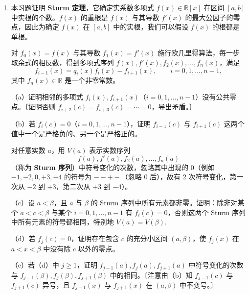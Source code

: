 \begin{enumerate}
（c）（\(\operatorname{ch}(K) = 2\)）若 \(K\) 的特征为 2，证明 \(f(x)\) 的判别式总是平方。证明可设 \(f(x)\) 具有形式 \(x^3+px+q\)，且 \(f(x)\) 的伽罗瓦群是 \(A_3\) 当且仅当二次式 \(x^2+qx+(p^3+q^2)\) 在 \(K\) 中有根（等价地，\((p^3+q^2)/q^2 \in K\) 属于 Artin--Schreier 映射 \(x \mapsto x^2-x\)（把 \(K\) 映到 \(K\)）的像）。

（d）设 \(t\) 在 \(\mathbb{F}_2\) 上超越，\(K = \mathbb{F}_2(t)\). 证明多项式 \(x^3+t^2x+t^3\)、\(x^3+(t^2+t+1)x+(t^2+t+1)\) 与 \(x^3+(t^2+t+1)x+(t^3+t^2+t)\) 的伽罗瓦群为 \(A_3\)，而 \(x^3+t^2x+t\) 与 \(x^3+x+t\) 的伽罗瓦群为 \(S_3\).

\item 本习题证明 \textbf{Sturm 定理}，它确定实系数多项式 \(f(x) \in \mathbb{R}[x]\) 在区间 \([a, b]\) 中实根的个数。\(f(x)\) 的重根是 \(f(x)\) 与其导数 \(f'(x)\) 的最大公因子的零点，因此为确定 \(f(x)\) 在 \([a, b]\) 中的实根，我们可以假设 \(f(x)\) 的根都是单根。

对 \(f_0(x) = f(x)\) 与其导数 \(f_1(x) = f'(x)\) 施行欧几里得算法，每一步取余式的相反数，得到多项式序列 \(f(x), f'(x), f_2(x), \ldots, f_n(x)\)，满足
\[
f_{i-1}(x) = q_i(x)f_i(x)-f_{i+1}(x), \qquad i = 0, 1, \ldots, n-1,
\]
其中 \(f_n(x) \in \mathbb{R}\) 是一个非零常数。

（a）证明相邻的多项式 \(f_i(x), f_{i+1}(x)\)（\(i = 0, 1, \ldots, n-1\)）没有公共零点。〔证明否则 \(f_{i+2}(c) = f_{i+3}(c) = \cdots = 0\)，导出矛盾。〕

（b）若 \(f_i(c) = 0\)（\(i = 0, 1, \ldots, n-1\)），证明 \(f_{i-1}(c)\) 与 \(f_{i+1}(c)\) 这两个值中一个是严格负的、另一个是严格正的。

对任意实数 \(a\)，用 \(V(a)\) 表示实数序列
\[
f(a), f'(a), f_2(a), \ldots, f_n(a)
\]
（称为 \textbf{Sturm 序列}）中符号变化的次数，忽略其中出现的 0（例如 \(-1, -2, 0, +3, -4\) 的符号为 \(--+-\)（忽略 0 后），故有 2 次符号变化，第一次从 \(-2\) 到 \(+3\)，第二次从 \(+3\) 到 \(-4\)）。

（c）设 \(a < \beta\)，且 \(a\) 与 \(\beta\) 的 Sturm 序列中所有元素都非零。证明：除非对某个 \(a < c < \beta\) 与某个 \(i = 0, 1, \ldots, n-1\) 有 \(f_i(c) = 0\)，否则这两个 Sturm 序列中所有元素的符号都相同，特别地 \(V(a) = V(\beta)\).

（d）若 \(f_j(c) = 0\)，证明存在包含 \(c\) 的充分小区间 \((a, \beta)\)，使 \(f_j(x)\) 在 \(a < x < \beta\) 中没有除 \(c\) 以外的零点。

（e）若（d）中 \(j \geq 1\)，证明 \(f_{j-1}(a), f_j(a), f_{j+1}(a)\) 中符号变化的次数与 \(f_{j-1}(\beta), f_j(\beta), f_{j+1}(\beta)\) 中的相同。〔注意由（b）知 \(f_{j-1}(c)\) 与 \(f_{j+1}(c)\) 异号，且 \(f_{j-1}(x)\) 与 \(f_{j+1}(x)\) 在 \((a, \beta)\) 中不变号。〕


\end{enumerate}
